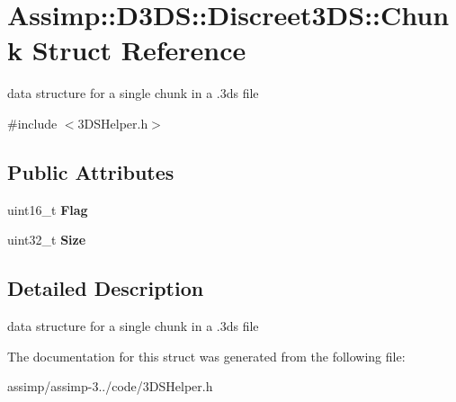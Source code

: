 \hypertarget{struct_assimp_1_1_d3_d_s_1_1_discreet3_d_s_1_1_chunk}{\section{Assimp\+:\+:D3\+D\+S\+:\+:Discreet3\+D\+S\+:\+:Chunk Struct Reference}
\label{struct_assimp_1_1_d3_d_s_1_1_discreet3_d_s_1_1_chunk}
}


data structure for a single chunk in a .3ds file  




{\ttfamily \#include $<$3\+D\+S\+Helper.\+h$>$}

\subsection*{Public Attributes}
\begin{DoxyCompactItemize}
\item 
\hypertarget{struct_assimp_1_1_d3_d_s_1_1_discreet3_d_s_1_1_chunk_a0ea0d9419caf1b5ba4d3500bf49ba0ef}{uint16\+\_\+t {\bfseries Flag}}\label{struct_assimp_1_1_d3_d_s_1_1_discreet3_d_s_1_1_chunk_a0ea0d9419caf1b5ba4d3500bf49ba0ef}

\item 
\hypertarget{struct_assimp_1_1_d3_d_s_1_1_discreet3_d_s_1_1_chunk_a8911c409c4107fc7eeb9a71b0feb06dd}{uint32\+\_\+t {\bfseries Size}}\label{struct_assimp_1_1_d3_d_s_1_1_discreet3_d_s_1_1_chunk_a8911c409c4107fc7eeb9a71b0feb06dd}

\end{DoxyCompactItemize}


\subsection{Detailed Description}
data structure for a single chunk in a .3ds file 

The documentation for this struct was generated from the following file\+:\begin{DoxyCompactItemize}
\item 
assimp/assimp-\/3../code/3\+D\+S\+Helper.\+h\end{DoxyCompactItemize}
